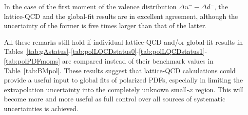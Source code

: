 In the case of the first moment of the valence distribution 
$\Delta u^--\Delta d^-$, the lattice-QCD and the global-fit results are 
in excellent agreement, although the uncertainty of the former is five times
larger than that of the latter.

All these remarks still hold if individual lattice-QCD and/or global-fit
results in Tables~\ref{tab:gAstatus}-\ref{tab:polLQCDstatus0}-\ref{tab:polLQCDstatus1}-\ref{tab:polPDFmoms}
are compared instead of their benchmark values in Table~\ref{tab:BMpol}.
%
These results suggest that lattice-QCD calculations could provide a useful
input to global fits of polarized PDFs, especially in limiting the
extrapolation uncertainty into the completely unknown small-$x$ region.
%
This will become more and more useful as full control over all sources of
systematic uncertainties is achieved.
